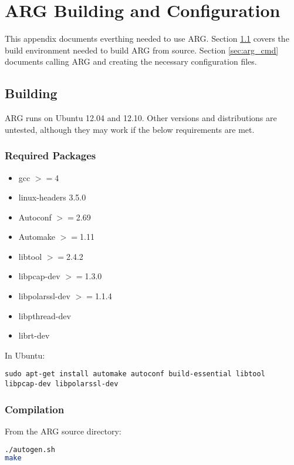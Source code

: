 \chapter{\ac{ARG} Building and Configuration}
\label{chp:argconf}

\par This appendix documents everthing needed to use \ac{ARG}. Section \ref{sec:arg_env} covers the build environment needed to build \ac{ARG} from source. Section \ref{sec:arg_cmd} documents calling \ac{ARG} and creating the necessary configuration files.

\section{Building}
\label{sec:arg_env}
\par \ac{ARG} runs on Ubuntu 12.04 and 12.10. Other versions and distributions are untested, although they may work if the below requirements are met. 

\subsection{Required Packages}
{\singlespace
\begin{itemize}
\item gcc $>=$4
\item linux-headers 3.5.0
\item Autoconf $>=$2.69
\item Automake $>=$1.11
\item libtool $>=$2.4.2
\item libpcap-dev $>=$1.3.0
\item libpolarssl-dev $>=$1.1.4
\item libpthread-dev 
\item librt-dev
\end{itemize}
}

\par In Ubuntu:
\begin{lstlisting}
sudo apt-get install automake autoconf build-essential libtool libpcap-dev libpolarssl-dev
\end{lstlisting}

\subsection{Compilation}
\par From the \ac{ARG} source directory:
\begin{lstlisting}[language=bash]
./autogen.sh
make
\end{lstlisting}

